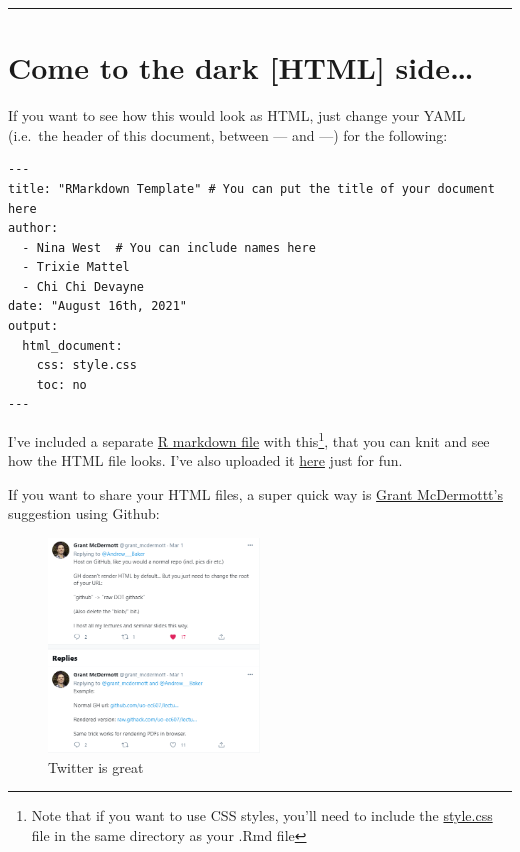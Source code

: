 \documentclass[
]{article}
\begin{document}
\begin{center}\rule{0.5\linewidth}{0.5pt}\end{center}

\hypertarget{come-to-the-dark-html-side}{%
\section{Come to the dark {[}HTML{]}
side\ldots{}}\label{come-to-the-dark-html-side}}

If you want to see how this would look as HTML, just change your YAML
(i.e.~the header of this document, between --- and ---) for the
following:

\begin{verbatim}
---
title: "RMarkdown Template" # You can put the title of your document here
author: 
  - Nina West  # You can include names here
  - Trixie Mattel
  - Chi Chi Devayne
date: "August 16th, 2021"
output: 
  html_document:
    css: style.css 
    toc: no
---
\end{verbatim}

I've included a separate
\href{https://raw.githubusercontent.com/maibennett/website_github/master/exampleSite/content/files/Rmarkdown_template.Rmd}{R
markdown file} with this\footnote{Note that if you want to use CSS
  styles, you'll need to include the
  \href{https://raw.githubusercontent.com/maibennett/website_github/master/exampleSite/content/files/style.css}{style.css}
  file in the same directory as your .Rmd file}, that you can knit and
see how the HTML file looks. I've also uploaded it
\href{https://www.magdalenabennett.com/files/Rmarkdown_template.html}{here}
just for fun.

If you want to share your HTML files, a super quick way is
\href{https://twitter.com/grant_mcdermott}{Grant McDermottt's}
suggestion using Github:

\begin{figure}
\centering
\includegraphics[width=0.5\textwidth,height=\textheight]{./Rmarkdown/images/host_html.png}
\caption{Twitter is great}
\end{figure}
\end{document}
